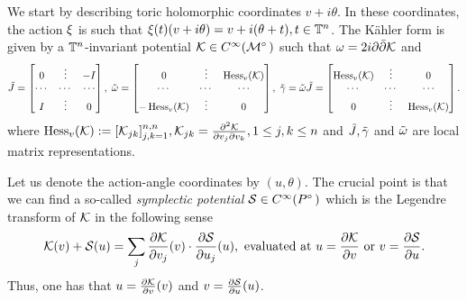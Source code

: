 \documentclass[notas.tex]{subfiles} 				%
\begin{document}
	
	We start by describing toric holomorphic coordinates $v + i \theta$. In these coordinates, the action $\xi$ is such that $\xi(t) (v+i\theta)=v+i(\theta+t), t \in \mathbb{T}^n$. The Kähler form is given by a $\mathbb{T}^n$-invariant potential $\kpot \in C^\infty(\mfld^\circ)$ such that $\omega = 2i\partial \bar{\partial} \mathcal{K}$ and
	\begin{align*}
		\tilde{J} = \begin{bmatrix}
			0 & \vdots & - I \\
			\cdots & \cdots & \cdots \\
			I & \vdots & 0
		\end{bmatrix}, \;
		\tilde{\omega} = \begin{bmatrix}
			0 & \vdots & \operatorname{Hess}_v(\mathcal{K}) \\
			\cdots & \cdots & \cdots \\
			-\operatorname{Hess}_v(\mathcal{K}) & \vdots & 0
		\end{bmatrix}, \;
		\tilde{\gamma} = \tilde{\omega} \tilde{J} = \begin{bmatrix}
			\operatorname{Hess}_v(\mathcal{K}) & \vdots & 0\\
			\cdots & \cdots & \cdots \\
			0 & \vdots & \operatorname{Hess}_v(\mathcal{K})
		\end{bmatrix}.
	\end{align*}
	where $\operatorname{Hess}_v(\mathcal{K}) := [\mathcal{K}_{jk}]_{j,k=1}^{n,n}, \mathcal{K}_{jk}=\frac{\partial^2 \mathcal{K}}{\partial v_j \partial v_k}, 1 \leq j,k \leq n$ and $\tilde {J}, \tilde {\gamma}$ and $\tilde {\omega}$ are local matrix representations.

	Let us denote the action-angle coordinates by $(u,\theta)$. The crucial point is that we can find a so-called \emph{symplectic potential} $\sgen \in C^\infty(P^\circ)$ which is the Legendre transform of $\mathcal{K}$ in the following sense
	\begin{align} \label{eq_legendre_transform}
		\mathcal{K}(v) + \mathcal{S}(u) = \sum_{j}\frac{\partial \mathcal{K}}{\partial v_j}(v) \cdot \frac{\partial \mathcal{S}}{\partial u_j}(u),\text{ evaluated at } u = \frac{\partial \mathcal{K}}{\partial v} \text{ or } v = \frac{\partial \mathcal{S}}{\partial u}.
	\end{align}
	Thus, one has that $u = \frac{\partial \mathcal{K}}{\partial v}(v)$ and $v = \frac{\partial \mathcal{S}}{\partial u}(u)$.
\end{document}
